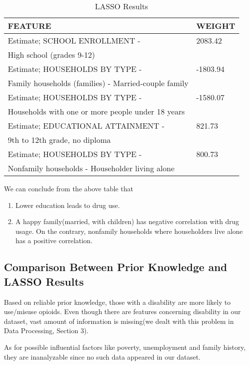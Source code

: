 \begin{table}[H]
	\centering
	\begin{tabular}{|l|l|}
		\hline
		\rowcolor[HTML]{656565} 
		{\color[HTML]{FFFFFF} \textbf{FEATURE}} & {\color[HTML]{FFFFFF} \textbf{WEIGHT}} \\ \hline
		
		Estimate; SCHOOL ENROLLMENT - 	&2083.42 \\ 
		High school (grades 9-12) & \\ \hline
		
		Estimate; HOUSEHOLDS BY TYPE - 	& -1803.94 \\
		Family households (families) - Married-couple family & \\ \hline
		Estimate; HOUSEHOLDS BY TYPE -  &	-1580.07  \\ Households with one or more people under 18 years &\\ \hline
		Estimate; EDUCATIONAL ATTAINMENT - 	& 821.73 \\ 
		9th to 12th grade, no diploma & \\ \hline
		Estimate; HOUSEHOLDS BY TYPE - & 	800.73 \\
		Nonfamily households - Householder living alone & \\ \hline
		
	\end{tabular}
	\centering
	\caption{LASSO Results}
\end{table}

We can conclude from the above table that
\begin{enumerate}
	\item Lower education leads to drug use.
	\item A happy family(married, with children) has negative correlation with drug usage. On the contrary, nonfamily households where householders live alone has a positive correlation.
\end{enumerate}

\subsection{Comparison Between Prior Knowledge and LASSO Results}
Based on reliable prior knowledge, those with a disability are more likely to use/misuse opioids. Even though there are features concerning disability in our dataset, vast amount of information is missing(we dealt with this problem in Data Processing, Section 3). 

As for possible influential factors like poverty, unemployment and family history, they are inanalyzable since no such data appeared in our dataset.

